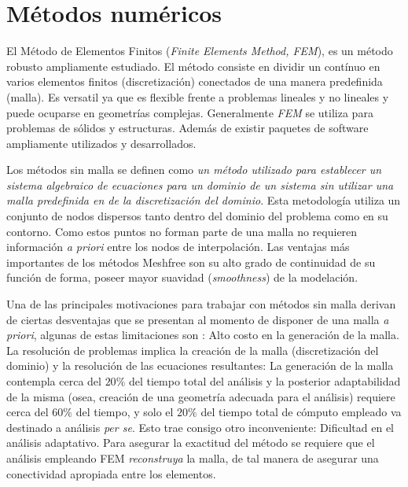
\section{Métodos numéricos} \label{cap2}

El Método de Elementos Finitos (\textit{Finite Elements Method, FEM}), es un método robusto ampliamente estudiado. El método consiste en dividir un contínuo en varios elementos finitos (discretización) conectados de una manera predefinida (malla). Es versatil ya que es flexible frente a problemas lineales y no lineales y puede ocuparse en geometrías complejas. Generalmente \textit{FEM} se utiliza para problemas de sólidos y estructuras. Además de existir paquetes de software ampliamente utilizados y desarrollados.

Los métodos sin malla se definen como \textit{un método utilizado para establecer un sistema algebraico de ecuaciones para un dominio de un sistema sin utilizar una malla predefinida en de la discretización del dominio}. Esta metodología utiliza un conjunto de nodos dispersos tanto dentro del dominio del problema como en su contorno. Como estos puntos no forman parte de una malla no requieren información \textit{a priori} entre los nodos de interpolación. Las ventajas más importantes de los métodos Meshfree son su alto grado de continuidad de su función de forma, poseer mayor suavidad (\textit{smoothness}) de la modelación.

Una de las principales motivaciones para trabajar con métodos sin malla derivan de ciertas desventajas que se presentan al momento de disponer de una malla \textit{a priori}, algunas de estas limitaciones son \cite{liuintro}: Alto costo en la generación de la malla. La resolución de problemas implica la creación de la malla (discretización del dominio) y la resolución de las ecuaciones resultantes: La generación de la malla contempla cerca del $20\%$ del tiempo total del análisis y la posterior adaptabilidad de la misma (osea, creación de una geometría adecuada para el análisis) requiere cerca del $60\%$ del tiempo, y solo el $20\%$ del tiempo total de cómputo empleado va destinado a análisis \textit{per se}\cite{IGA_LIBRO}. Esto trae consigo otro inconveniente: Dificultad en el análisis adaptativo. Para asegurar la exactitud del método se requiere que el análisis empleando FEM \textit{reconstruya} la malla, de tal manera de asegurar una conectividad apropiada entre los elementos.


